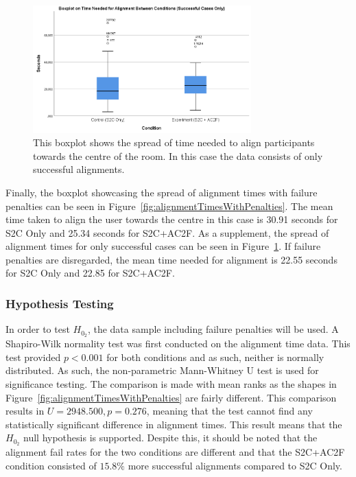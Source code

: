 \begin{figure}[tbph]
    \centering
    \includegraphics[width=0.75\textwidth]{figures/graphs/boxplotAlignmentTimesWithoutPenalties.png}
    \caption[Boxplot on Time Needed To Align Participants To Centre (Successful Cases Only)]{This boxplot shows the spread of time needed to align participants towards the centre of the room. In this case the data consists of only successful alignments.}
    \label{fig:AlignmentTimesWithoutPenalties}
\end{figure}

Finally, the boxplot showcasing the spread of alignment times with failure penalties can be seen in Figure~\ref{fig:alignmentTimesWithPenalties}. The mean time taken to align the user towards the centre in this case is 30.91 seconds for S2C Only and 25.34 seconds for S2C+AC2F. As a supplement, the spread of alignment times for only successful cases can be seen in Figure~\ref{fig:AlignmentTimesWithoutPenalties}. If failure penalties are disregarded, the mean time needed for alignment is 22.55 seconds for S2C Only and 22.85 for S2C+AC2F. 

\subsubsection{Hypothesis Testing}
In order to test $H_{0_2}$, the data sample including failure penalties will be used. A Shapiro-Wilk normality test was first conducted on the alignment time data. This test provided $p < 0.001$ for both conditions and as such, neither is normally distributed. As such, the non-parametric Mann-Whitney U test is used for significance testing. The comparison is made with mean ranks as the shapes in Figure~\ref{fig:alignmentTimesWithPenalties} are fairly different. This comparison results in $U = 2948.500, p = 0.276$, meaning that the test cannot find any statistically significant difference in alignment times. This result means that the $H_{0_2}$ null hypothesis is supported. Despite this, it should be noted that the alignment fail rates for the two conditions are different and that the S2C+AC2F condition consisted of $15.8\%$ more successful alignments compared to S2C Only. 

